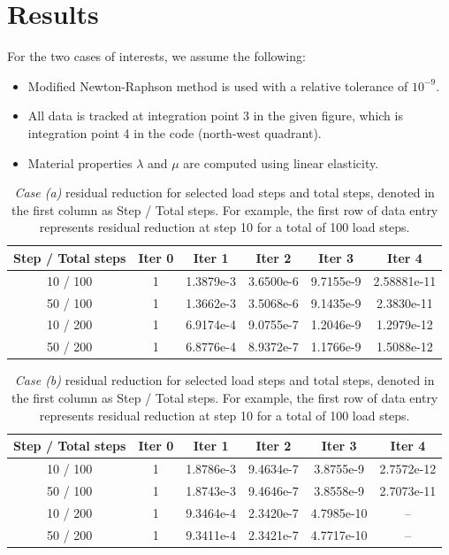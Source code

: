 \section{Results}
For the two cases of interests, we assume the following:
\begin{itemize}
    \item Modified Newton-Raphson method is used with a relative tolerance of $10^{-9}$.
    \item All data is tracked at integration point 3 in the given figure, which is integration point 4 in the code (north-west quadrant). 
    \item Material properties $\lambda$ and $\mu$ are computed using linear elasticity. 
\end{itemize}

\begin{table}[!ht]
\centering
\begin{tabular}{|c|c|c|c|c|c|}
    \hline
    Step / Total steps & Iter 0 & Iter 1 & Iter 2 & Iter 3 & Iter 4 \\
    \hline 
    10 / 100 & 1 & 1.3879e-3 & 3.6500e-6 & 9.7155e-9 & 2.58881e-11 \\
    \hline 
    50 / 100 & 1 & 1.3662e-3 & 3.5068e-6 & 9.1435e-9 & 2.3830e-11 \\
    \hline 
    10 / 200 & 1 & 6.9174e-4 & 9.0755e-7 & 1.2046e-9 & 1.2979e-12 \\
    \hline
    50 / 200 & 1 & 6.8776e-4 & 8.9372e-7 & 1.1766e-9 & 1.5088e-12 \\
    \hline
\end{tabular}
\caption{\emph{Case (a)} residual reduction for selected load steps and total steps, denoted in the first column as Step / Total steps. For  example, the first row of data entry represents residual reduction at step 10 for a total of 100 load steps.}
\end{table}

\begin{table}[!ht]
\centering
\begin{tabular}{|c|c|c|c|c|c|}
    \hline
    Step / Total steps & Iter 0 & Iter 1 & Iter 2 & Iter 3 & Iter 4 \\
    \hline 
    10 / 100 & 1 & 1.8786e-3 & 9.4634e-7 & 3.8755e-9 & 2.7572e-12 \\
    \hline 
    50 / 100 & 1 & 1.8743e-3 & 9.4646e-7 & 3.8558e-9 & 2.7073e-11 \\
    \hline 
    10 / 200 & 1 & 9.3464e-4 & 2.3420e-7 & 4.7985e-10 & -- \\
    \hline
    50 / 200 & 1 & 9.3411e-4 & 2.3421e-7 & 4.7717e-10 & -- \\
    \hline
\end{tabular}
\caption{\emph{Case (b)} residual reduction for selected load steps and total steps, denoted in the first column as Step / Total steps. For  example, the first row of data entry represents residual reduction at step 10 for a total of 100 load steps.}
\end{table}

